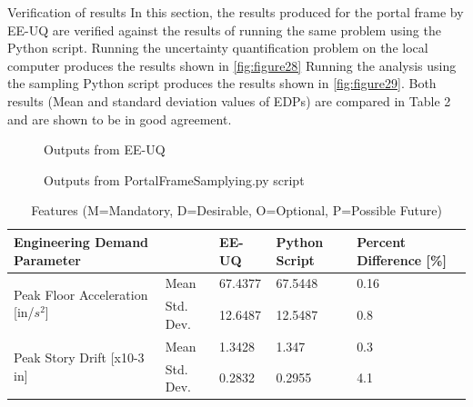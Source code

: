 Verification of results
In this section, the results produced for the portal frame by EE-UQ are verified against the results of running the same problem using the Python script. 
Running the uncertainty quantification problem on the local computer produces the results shown in \autoref{fig:figure28} 
Running the analysis using the sampling Python script produces the results shown in \autoref{fig:figure29}. 
Both results (Mean and standard deviation values of EDPs) are compared in Table 2 and are shown to be in good agreement.
\begin{figure}[!htbp]
  \caption{Outputs from EE-UQ}
  \label{fig:figure28}
\end{figure}


\begin{figure}[!htbp]
  \caption{Outputs from PortalFrameSamplying.py script}
  \label{fig:figure29}
\end{figure}




\begin{table}[hbt!]                 
  \centering
\begin{adjustbox}{max width=\textwidth}            
  \begin{tabular}{lllll}                    
    \toprule          
      Engineering Demand Parameter &	 & EE-UQ	& Python Script	 & Percent Difference [\%]  \\ \hline
    
	\multirow{2}{*}{Peak Floor Acceleration [in/$s^2$]} 
	 & Mean &	67.4377	& 67.5448	& 0.16 \\
      & Std. Dev.	& 12.6487	 & 12.5487	& 0.8 \\ \hline
      
      \multirow{2}{*}{Peak Story Drift [x10-3 in]} 
      & Mean &	1.3428 &	1.347 &	0.3 \\
      & Std. Dev.	& 0.2832 &	0.2955	& 4.1	 \\

      \bottomrule      
                            
  \end{tabular}
\end{adjustbox}
  \caption{Features (M=Mandatory, D=Desirable, O=Optional, P=Possible Future)}             
  \label{tab:edp}                 
\end{table}